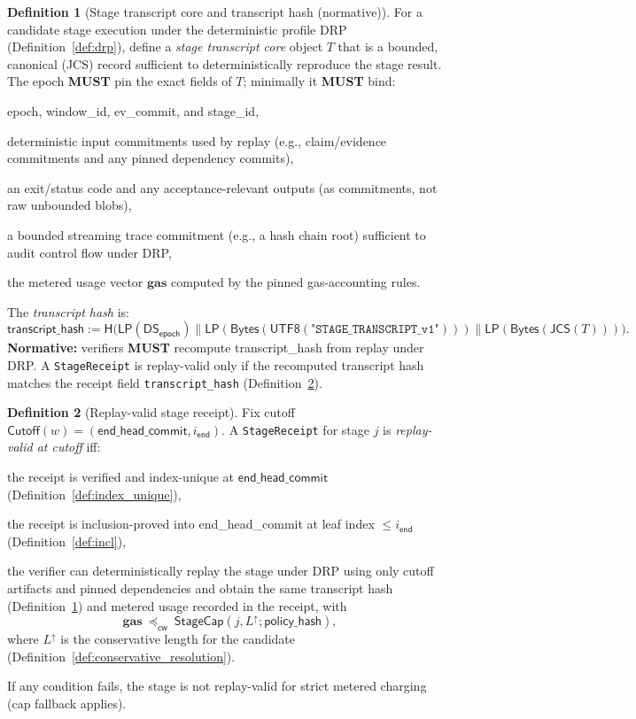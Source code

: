 \documentclass[11pt]{article}
\newcommand{\MUST}{\textbf{MUST}}
\newcommand{\code}[1]{\texttt{#1}}
\newcommand{\term}[1]{\emph{#1}}
\newcommand{\1}{\mathbf{1}}
\newcommand{\Hash}{\mathsf{H}}
\newcommand{\DS}{\mathsf{DS}}
\newcommand{\LP}{\mathsf{LP}}
\newcommand{\cwise}{\preceq_{\textsf{cw}}}
\theoremstyle{definition}
\newtheorem{definition}{Definition}
\theoremstyle{plain}
\begin{document}
\begin{definition}[Stage transcript core and transcript hash (normative)]
\label{def:stage_transcript}
For a candidate stage execution under the deterministic profile \textsf{DRP} (Definition~\ref{def:drp}), define a \term{stage transcript core} object $T$ that is a bounded, canonical (JCS) record sufficient to deterministically reproduce the stage result. The epoch \MUST{} pin the exact fields of $T$; minimally it \MUST{} bind:
\begin{tightitemize}
\item \textsf{epoch}, \textsf{window\_id}, \textsf{ev\_commit}, and \textsf{stage\_id},
\item deterministic input commitments used by replay (e.g., claim/evidence commitments and any pinned dependency commits),
\item an exit/status code and any acceptance-relevant outputs (as commitments, not raw unbounded blobs),
\item a bounded streaming trace commitment (e.g., a hash chain root) sufficient to audit control flow under \textsf{DRP},
\item the metered usage vector $\mathbf{gas}$ computed by the pinned gas-accounting rules.
\end{tightitemize}

The \term{transcript hash} is:
\[
\textsf{transcript\_hash}:=\Hash\big(\LP(\DS_{\textsf{epoch}})\|\LP(\mathsf{Bytes}(\textsf{UTF8}(\texttt{"STAGE\_TRANSCRIPT\_v1"})))\|\LP(\mathsf{Bytes}(\textsf{JCS}(T)))\big).
\]
\textbf{Normative:} verifiers \MUST{} recompute \textsf{transcript\_hash} from replay under \textsf{DRP}. A \code{StageReceipt} is replay-valid only if the recomputed transcript hash matches the receipt field \code{transcript\_hash} (Definition~\ref{def:meter_valid}).
\end{definition}



\begin{definition}[Replay-valid stage receipt]
\label{def:meter_valid}
Fix cutoff $\textsf{Cutoff}(w)=(\textsf{end\_head\_commit}, i_{\textsf{end}})$.
A \code{StageReceipt} for stage $j$ is \term{replay-valid at cutoff} iff:
\begin{tightitemize}
\item the receipt is verified and index-unique at $\textsf{end\_head\_commit}$ (Definition~\ref{def:index_unique}),
\item the receipt is inclusion-proved into \textsf{end\_head\_commit} at leaf index $\le i_{\textsf{end}}$ (Definition~\ref{def:incl}),
\item the verifier can deterministically replay the stage under \textsf{DRP} using only cutoff artifacts and pinned dependencies and obtain the same transcript hash (Definition~\ref{def:stage_transcript}) and metered usage recorded in the receipt, with
\[
\mathbf{gas}\ \cwise\ \mathsf{StageCap}(j,L^\uparrow;\textsf{policy\_hash}),
\]
where $L^\uparrow$ is the conservative length for the candidate (Definition~\ref{def:conservative_resolution}).
\end{tightitemize}
If any condition fails, the stage is not replay-valid for strict metered charging (cap fallback applies).
\end{definition}
\end{document}
